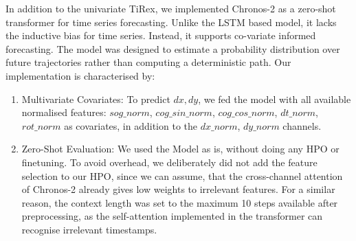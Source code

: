        In addition to the univariate TiRex, we implemented Chronos-2 \parencite{ansari2025chronos2} as a zero-shot transformer for time series forecasting. Unlike the \ac{LSTM} based model, it lacks the inductive bias for time series. Instead, it supports co-variate informed forecasting.  %
        The model was designed to estimate a probability distribution over future trajectories rather than computing a deterministic path. Our implementation is characterised by:
    
        \begin{enumerate}
            \item Multivariate Covariates: To predict $dx, dy$, we fed the model with all available normalised features: $sog\_norm$, $cog\_sin\_norm$, $cog\_cos\_norm$, $dt\_norm$, $rot\_norm$  as covariates, in addition to the $dx\_norm$, $dy\_norm$ channels.
            \item Zero-Shot Evaluation: We used the Model as is, without doing any \ac{HPO} or finetuning. To avoid overhead, we deliberately did not add the feature selection to our \ac{HPO}, since we can assume, that the cross-channel attention of Chronos-2 already gives low weights to irrelevant features. %
            For a similar reason, the context length was set to the maximum 10 steps available after preprocessing, as the self-attention implemented in the transformer can recognise irrelevant timestamps. %
        \end{enumerate}
    
